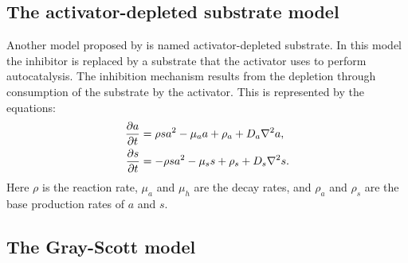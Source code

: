 \subsection{The activator-depleted substrate model}
Another model proposed by \citet{gierer1972} is named activator-depleted substrate. In this model the inhibitor is replaced by a substrate that the activator uses to perform autocatalysis. The inhibition mechanism results from the depletion through consumption of the substrate by the activator. This is represented by the equations:
	\begin{equation}
	\begin{aligned} \label{eq:activatorSubstrateRD}
		\frac{\partial a}{\partial t} &= \rho sa^2 - \mu_a a + \rho_a + D_a \nabla^2 a,\\
		\frac{\partial s}{\partial t} &= -\rho sa^2 - \mu_s s + \rho_s + D_s \nabla^2 s.
	\end{aligned}
	\end{equation}
Here $\rho$ is the reaction rate, $\mu_a$ and $\mu_h$ are the decay rates, and $\rho_a$ and $\rho_s$ are the base production rates of $a$ and $s$.

\subsection{The Gray-Scott model}


